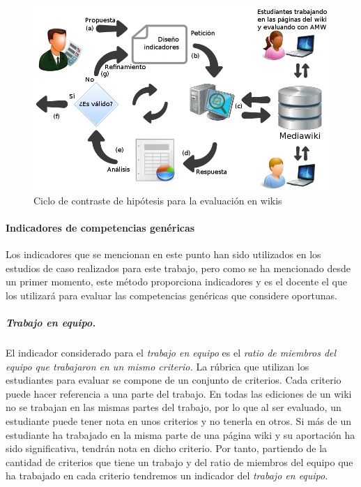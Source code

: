 \begin{figure}
  \begin{center}
    \includegraphics[scale=0.45]{AmwDiagram2.png}
  \end{center}
  \caption{Ciclo de contraste de hipótesis para la evaluación en wikis}
  \label{fig:AmwDiagram2}
\end{figure}

			\paragraph*{Indicadores de competencias genéricas}

				Los indicadores que se mencionan en este punto han sido utilizados en los estudios de caso realizados para este trabajo, pero como se ha mencionado desde un primer momento, este método proporciona indicadores y es el docente el que los utilizará para evaluar las competencias genéricas que considere oportunas.

			\subparagraph*{Trabajo en equipo.}
			El indicador considerado para el \emph{trabajo en equipo} es el \emph{ratio de miembros del equipo que trabajaron en un mismo criterio.} La rúbrica que utilizan los estudiantes para evaluar se compone de un conjunto de criterios. Cada criterio puede hacer referencia a una parte del trabajo. En todas las ediciones de un wiki no se trabajan en las mismas partes del trabajo, por lo que al ser evaluado, un estudiante puede tener nota en unos criterios y no tenerla en otros. Si más de un estudiante ha trabajado en la misma parte de una página wiki y su aportación ha sido significativa, tendrán nota en dicho criterio. Por tanto, partiendo de la cantidad de criterios que tiene un trabajo y del ratio de miembros del equipo que ha trabajado en cada criterio tendremos un indicador del \emph{trabajo en equipo}.

